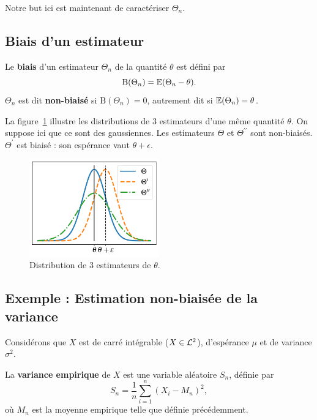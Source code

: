 Notre but ici est maintenant de caractériser $\Theta_n$.

\subsection{Biais d'un estimateur}
\label{sec:biais_estimateur}
Le \textbf{biais} d'un estimateur $\Theta_n$ de la quantité $\theta$ est défini par 
\begin{equation}
  \text{B}(\Theta_n) = \mathbb{E}(\Theta_n - \theta).
  \label{eq:biais}
\end{equation}
$\Theta_n$ est dit \textbf{non-biaisé} si $\text{B}(\Theta_n) = 0$, autrement dit si
$\mathbb{E}(\Theta_n) = \theta$.

La figure~\ref{fig:biais_variance} illustre les distributions de 3 estimateurs
d'une même quantité $\theta$. On suppose ici que ce sont des gaussiennes. Les
estimateurs $\Theta$ et $\Theta^{\prime\prime}$ sont
non-biaisés. $\Theta^\prime$ est biaisé : son espérance vaut
$\theta + \epsilon$.

\begin{figure}[h]
  \centering
  \includegraphics[width=0.5\textwidth]{figures/estimation/biais_variance}
  \caption{Distribution de 3 estimateurs de $\theta$.}
  \label{fig:biais_variance}
\end{figure}

\subsection{Exemple : Estimation non-biaisée de la variance}
\label{sec:unbiased_variance_estimation}
Considérons que $X$ est de carré intégrable ($X \in \mathcal{L}^2$), d'espérance $\mu$ et
de variance $\sigma^2$.

La \textbf{variance empirique} de $X$ est une variable aléatoire $S_n$, définie
par
\begin{equation}
  S_n = \frac1n \sum_{i=1}^n (X_i - M_n)^2,
  \label{eq:variance_empirique}
\end{equation}
où $M_n$ est la moyenne empirique telle que définie précédemment.

